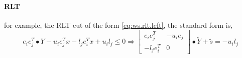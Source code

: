 \documentclass[../main]{subfiles}
\begin{document}
\paragraph{RLT} for example, the RLT cut of the form \eqref{eq:ws.rlt.left}, the standard form is,
\begin{equation*}
    e_ie_j^T\bullet Y - u_i e_j^Tx - l_j e_i^Tx + u_i l_j \le 0
    \Rightarrow \begin{bmatrix} e_ie_j^T  & - u_i e_j \\ - l_j e_i^T & 0 \end{bmatrix}
    \bullet \tilde Y + \tilde s = - u_il_j
\end{equation*}
\end{document}

